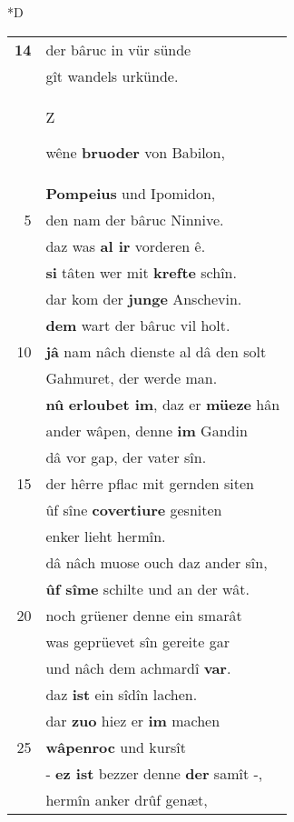 \documentclass[8pt,a4paper,notitlepage]{article}
\begin{document}
\begin{table}[ht]
\begin{minipage}[t]{0.5\linewidth}
\small
\begin{center}*D
\end{center}
\begin{tabular}{rl}
\textbf{14} & der bâruc in vür sünde\\ 
 & gît wandels urkünde.\\ 
 & \begin{large}Z\end{large}wêne \textbf{bruoder} von Babilon,\\ 
 & \textbf{Pompeius} und Ipomidon,\\ 
5 & den nam der bâruc Ninnive.\\ 
 & daz was \textbf{al ir} vorderen ê.\\ 
 & \textbf{si} tâten wer mit \textbf{krefte} schîn.\\ 
 & dar kom der \textbf{junge} Anschevin.\\ 
 & \textbf{dem} wart der bâruc vil holt.\\ 
10 & \textbf{jâ} nam nâch dienste al dâ den solt\\ 
 & Gahmuret, der werde man.\\ 
 & \textbf{nû} \textbf{erloubet im}, daz er \textbf{müeze} hân\\ 
 & ander wâpen, denne \textbf{im} Gandin\\ 
 & dâ vor gap, der vater sîn.\\ 
15 & der hêrre pflac mit gernden siten\\ 
 & ûf sîne \textbf{covertiure} gesniten\\ 
 & enker lieht hermîn.\\ 
 & dâ nâch muose ouch daz ander sîn,\\ 
 & \textbf{ûf sîme} schilte und an der wât.\\ 
20 & noch grüener denne ein smarât\\ 
 & was geprüevet sîn gereite gar\\ 
 & und nâch dem achmardî \textbf{var}.\\ 
 & daz \textbf{ist} ein sîdîn lachen.\\ 
 & dar \textbf{zuo} hiez er \textbf{im} machen\\ 
25 & \textbf{wâpenroc} und kursît\\ 
 & - \textbf{ez ist} bezzer denne \textbf{der} samît -,\\ 
 & hermîn anker drûf genæt,\\ 

\end{tabular}
\end{minipage}
\end{table}
\end{document}
